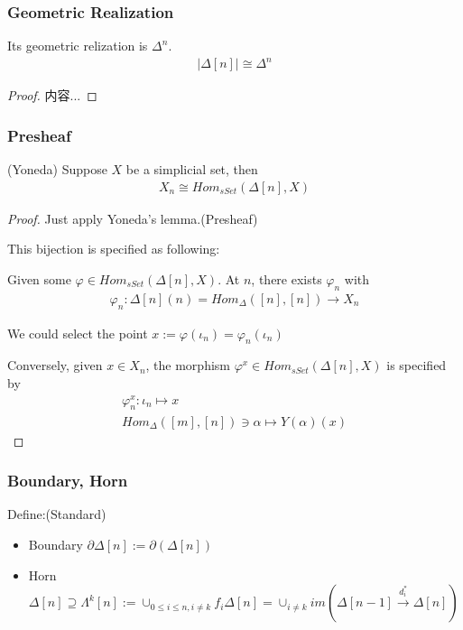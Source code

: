 \documentclass[Total.tex]{subfiles}
\begin{document}
				\subsubsection{Geometric Realization}
				
				\begin{proposition}
					Its geometric relization is $\Delta^n$. 
					\begin{gather*}
						|\Delta[n]|\cong \Delta^n
					\end{gather*}
				\end{proposition}
				\begin{proof}
					内容...
				\end{proof}
				
				\subsubsection{Presheaf}
				
				\begin{proposition}
					(Yoneda) Suppose $X$ be a simplicial set, then
					\begin{gather*}
						X_n\cong Hom_{sSet}(\Delta[n],X)
					\end{gather*}
				\end{proposition}
				\begin{proof}
					Just apply Yoneda's lemma.(Presheaf)
					
					This bijection is specified as following: 
					
					Given some $\varphi\in Hom_{sSet}(\Delta[n],X)$. At $n$, there exists $\varphi_n$ with 
					\begin{gather*}
						\varphi_n:\Delta[n](n)=Hom_\Delta([n],[n])\rightarrow X_n
					\end{gather*}
					
					We could select the point $x:=\varphi(\iota_n)=\varphi_n(\iota_n)$
					
					Conversely, given $x\in X_n$, the morphism $\varphi^x\in Hom_{sSet}(\Delta[n],X)$ is specified by
					\begin{gather*}
						\varphi^x_n:\iota_n\mapsto x\\
						Hom_\Delta([m],[n])\ni \alpha\mapsto Y(\alpha)(x)
					\end{gather*}
				\end{proof}
			
			\subsubsection{Boundary, Horn}
			\begin{Def}
				Define:(Standard)
				\begin{itemize}
					\item Boundary $\partial\Delta[n]:=\partial(\Delta[n])$
					
					\item Horn $\Delta[n]\supseteq \Lambda^k[n]:=\cup_{0\leq i\leq n,i\not=k} f_i\Delta[n]=\cup_{i\not=k} im(\Delta[n-1]\stackrel{d_i^*}{\rightarrow} \Delta[n])$
				\end{itemize}
			\end{Def}
			
\end{document}
